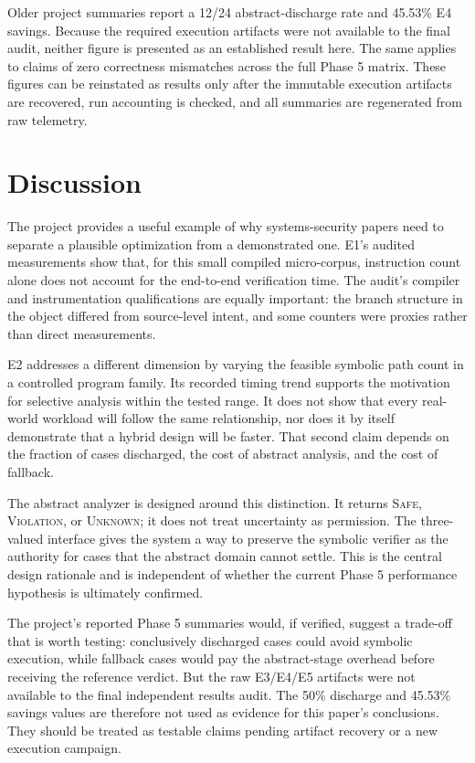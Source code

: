 \documentclass[12pt,a4paper]{article}
\newcommand{\safe}{\textsc{Safe}}
\newcommand{\violation}{\textsc{Violation}}
\newcommand{\unknown}{\textsc{Unknown}}
\begin{document}
Older project summaries report a 12/24 abstract-discharge rate and 45.53\% E4 savings. Because the required execution artifacts were not available to the final audit, neither figure is presented as an established result here. The same applies to claims of zero correctness mismatches across the full Phase 5 matrix. These figures can be reinstated as results only after the immutable execution artifacts are recovered, run accounting is checked, and all summaries are regenerated from raw telemetry.

\section{Discussion}

The project provides a useful example of why systems-security papers need to separate a plausible optimization from a demonstrated one. E1's audited measurements show that, for this small compiled micro-corpus, instruction count alone does not account for the end-to-end verification time. The audit's compiler and instrumentation qualifications are equally important: the branch structure in the object differed from source-level intent, and some counters were proxies rather than direct measurements.

E2 addresses a different dimension by varying the feasible symbolic path count in a controlled program family. Its recorded timing trend supports the motivation for selective analysis within the tested range. It does not show that every real-world workload will follow the same relationship, nor does it by itself demonstrate that a hybrid design will be faster. That second claim depends on the fraction of cases discharged, the cost of abstract analysis, and the cost of fallback.

The abstract analyzer is designed around this distinction. It returns \safe, \violation, or \unknown; it does not treat uncertainty as permission. The three-valued interface gives the system a way to preserve the symbolic verifier as the authority for cases that the abstract domain cannot settle. This is the central design rationale and is independent of whether the current Phase 5 performance hypothesis is ultimately confirmed.

The project's reported Phase 5 summaries would, if verified, suggest a trade-off that is worth testing: conclusively discharged cases could avoid symbolic execution, while fallback cases would pay the abstract-stage overhead before receiving the reference verdict. But the raw E3/E4/E5 artifacts were not available to the final independent results audit. The 50\% discharge and 45.53\% savings values are therefore not used as evidence for this paper's conclusions. They should be treated as testable claims pending artifact recovery or a new execution campaign.
\end{document}
